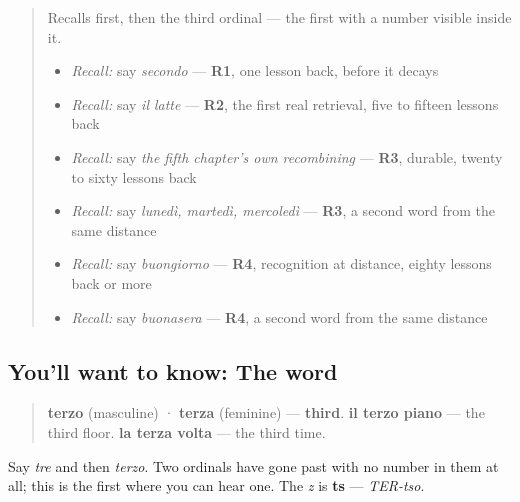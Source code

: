 \label{lesson:IT-C26-terzo}



\begin{quote}
Recalls first, then the third ordinal — the first with a number visible inside it.

\begin{itemize}
\raggedright
  \item \emph{Recall:} say \emph{secondo} — \textbf{R1}, one lesson back, before it decays
  \item \emph{Recall:} say \emph{il latte} — \textbf{R2}, the first real retrieval, five to fifteen lessons back
  \item \emph{Recall:} say \emph{the fifth chapter's own recombining} — \textbf{R3}, durable, twenty to sixty lessons back
  \item \emph{Recall:} say \emph{lunedì, martedì, mercoledì} — \textbf{R3}, a second word from the same distance
  \item \emph{Recall:} say \emph{buongiorno} — \textbf{R4}, recognition at distance, eighty lessons back or more
  \item \emph{Recall:} say \emph{buonasera} — \textbf{R4}, a second word from the same distance
\end{itemize}
\end{quote}

\subsection*{You'll want to know: The word}
\begin{quote}
\textbf{terzo} (masculine) · \textbf{terza} (feminine) — \textbf{third}. \textbf{il terzo piano} — the third floor. \textbf{la terza volta} — the third time.
\end{quote}

Say \emph{tre} and then \emph{terzo}. Two ordinals have gone past with no number in them at all; this is the first where you can hear one. The \emph{z} is \textbf{ts} — \emph{TER-tso}.

